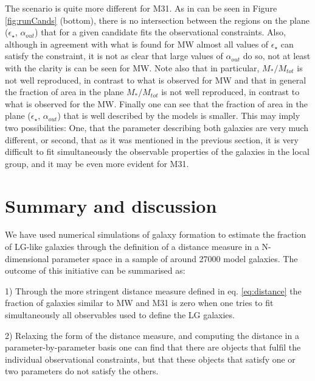 \documentclass[useAMS,usenatbib]{mn2e}
\begin{document}
The scenario is quite more different for M31. As in can be seen in
Figure \ref{fig:runCands} (bottom), there is no intersection between
the regions on the plane ($\epsilon_{\star}$, $\alpha_{out}$) that for
a given candidate fits the observational constraints. Also, although
in agreement with what is found for MW almost all values of
$\epsilon_{\star}$ can satisfy the constraint, it is not as clear that
large values of $\alpha_{out}$ do so, not at least with the clarity is
can be seen for MW. Note also that in particular, $M_*/M_{tot}$ is not
well reproduced, in contrast to what is observed for MW and that in
general the fraction of area in the plane $M_*/M_{tot}$ is not well
reproduced, in contrast to what is observed for the MW. Finally one
can see that the fraction of area in the plane ($\epsilon_{\star}$,
$\alpha_{out}$) that is well described by the models is smaller. This
may imply two possibilities: One, that the parameter describing both
galaxies are very much different, or second, that as it was mentioned
in the previous section, it is very difficult to fit simultaneously
the observable properties of the galaxies in the local group, and it
may be even more evident for M31.




\section{Summary and discussion}

We have used numerical simulations of galaxy formation to estimate the
fraction of LG-like galaxies through the definition of a distance
measure in a N-dimensional parameter space in a sample of around 27000
model galaxies. The outcome of this initiative can be summarised as:

1) Through the more stringent distance measure defined in
eq. \ref{eq:distance} the fraction of galaxies similar to MW and M31
is zero when one tries to fit simultaneously all observables used to
define the LG galaxies.

2) Relaxing the form of the distance measure, and computing the
distance in a parameter-by-parameter basis one can find that there are
objects that fulfil the individual observational constraints, but
that these objects that satisfy one or two parameters do not satisfy
the others.
\end{document}
